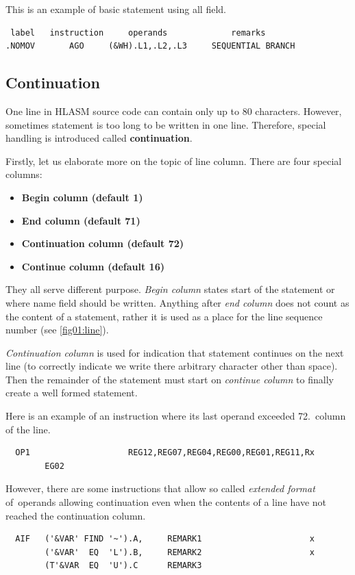 This is an example of basic statement using all field.
\begin{verbatim}
 label   instruction     operands             remarks
.NOMOV       AGO     (&WH).L1,.L2,.L3     SEQUENTIAL BRANCH
\end{verbatim}

\subsection{Continuation}

One line in HLASM source code can contain only up to 80 characters. However, sometimes statement is too long to be written in one line. Therefore, special handling is introduced called \textbf{continuation}.

Firstly, let us elaborate more on the topic of line column. There are four special columns:
\begin{itemize}
	\item \textbf{Begin column (default 1)}
	
	\item \textbf{End column (default 71)}
	
	\item \textbf{Continuation column (default 72)}
	
	\item \textbf{Continue column (default 16)}
\end{itemize}
They all serve different purpose. \textit{Begin column} states start of the statement or where name field should be written. Anything after \textit{end column} does not count as the content of a statement, rather it is used as a place for the line sequence number (see \ref{fig01:line}). 

\textit{Continuation column} is used for indication that statement continues on the next line (to correctly indicate we write there arbitrary character other than space). Then the remainder of the statement must start on \textit{continue column} to finally create a well formed statement.

Here is an example of an instruction where its last operand exceeded 72.~column of the line.
\begin{verbatim}
  OP1                    REG12,REG07,REG04,REG00,REG01,REG11,Rx
        EG02
\end{verbatim} 
However, there are some instructions that allow so called \textit{extended format} of~operands allowing continuation even when the contents of a line have not reached  the continuation column. 
\begin{verbatim}
  AIF   ('&VAR' FIND '~').A,     REMARK1                      x
        ('&VAR'  EQ  'L').B,     REMARK2                      x
        (T'&VAR  EQ  'U').C      REMARK3 
\end{verbatim} 


